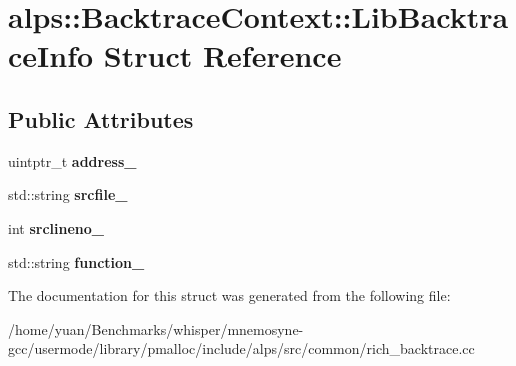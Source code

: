 \hypertarget{structalps_1_1BacktraceContext_1_1LibBacktraceInfo}{}\section{alps\+:\+:Backtrace\+Context\+:\+:Lib\+Backtrace\+Info Struct Reference}
\label{structalps_1_1BacktraceContext_1_1LibBacktraceInfo}
\subsection*{Public Attributes}
\begin{DoxyCompactItemize}
\item 
uintptr\+\_\+t {\bfseries address\+\_\+}\hypertarget{structalps_1_1BacktraceContext_1_1LibBacktraceInfo_a6f081350503486bc958cfa0678f6259b}{}\label{structalps_1_1BacktraceContext_1_1LibBacktraceInfo_a6f081350503486bc958cfa0678f6259b}

\item 
std\+::string {\bfseries srcfile\+\_\+}\hypertarget{structalps_1_1BacktraceContext_1_1LibBacktraceInfo_a40f51d259e2e2bb91d42b485caf054e3}{}\label{structalps_1_1BacktraceContext_1_1LibBacktraceInfo_a40f51d259e2e2bb91d42b485caf054e3}

\item 
int {\bfseries srclineno\+\_\+}\hypertarget{structalps_1_1BacktraceContext_1_1LibBacktraceInfo_a79b52c6cbb725765a7ff1a5b0922a684}{}\label{structalps_1_1BacktraceContext_1_1LibBacktraceInfo_a79b52c6cbb725765a7ff1a5b0922a684}

\item 
std\+::string {\bfseries function\+\_\+}\hypertarget{structalps_1_1BacktraceContext_1_1LibBacktraceInfo_a60af9337a0b07c3d79c931ca66232b9d}{}\label{structalps_1_1BacktraceContext_1_1LibBacktraceInfo_a60af9337a0b07c3d79c931ca66232b9d}

\end{DoxyCompactItemize}


The documentation for this struct was generated from the following file\+:\begin{DoxyCompactItemize}
\item 
/home/yuan/\+Benchmarks/whisper/mnemosyne-\/gcc/usermode/library/pmalloc/include/alps/src/common/rich\+\_\+backtrace.\+cc\end{DoxyCompactItemize}
